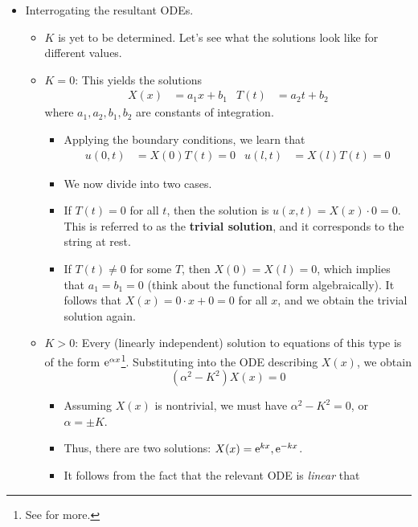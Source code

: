 \documentclass[../notes.tex]{subfiles}
\begin{document}
\begin{itemize}
    \item Interrogating the resultant ODEs.
    \begin{itemize}
        \item $K$ is yet to be determined. Let's see what the solutions look like for different values.
        \item \underline{$K=0$}: This yields the solutions
        \begin{align*}
            X(x) &= a_1x+b_1&
            T(t) &= a_2t+b_2
        \end{align*}
        where $a_1,a_2,b_1,b_2$ are constants of integration.
        \begin{itemize}
            \item Applying the boundary conditions, we learn that
            \begin{align*}
                u(0,t) &= X(0)T(t) = 0&
                u(l,t) &= X(l)T(t) = 0
            \end{align*}
            \item We now divide into two cases.
            \item If $T(t)=0$ for all $t$, then the solution is $u(x,t)=X(x)\cdot 0=0$. This is referred to as the \textbf{trivial solution}, and it corresponds to the string at rest.
            \item If $T(t)\neq 0$ for some $T$, then $X(0)=X(l)=0$, which implies that $a_1=b_1=0$ (think about the functional form algebraically). It follows that $X(x)=0\cdot x+0=0$ for all $x$, and we obtain the trivial solution again.
        \end{itemize}
        \item \underline{$K>0$}: Every (linearly independent) solution to equations of this type is of the form $\e[\alpha x]$\footnote{See \textcite{bib:MATH25700Notes} for more.}. Substituting into the ODE describing $X(x)$, we obtain
        \begin{equation*}
            (\alpha^2-K^2)X(x) = 0
        \end{equation*}
        \begin{itemize}
            \item Assuming $X(x)$ is nontrivial, we must have $\alpha^2-K^2=0$, or $\alpha=\pm K$.
            \item Thus, there are two solutions: $X(x)=\e[kx],\e[-kx]$.
            \item It follows from the fact that the relevant ODE is \emph{linear} that
            \begin{equation*}

\end{equation*}
\end{itemize}
\end{itemize}
\end{itemize}
\end{document}
